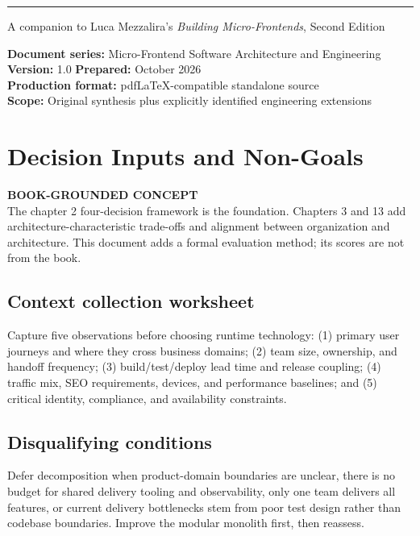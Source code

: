 \documentclass[11pt,letterpaper,oneside]{report}
\newcommand{\based}[1]{\begin{sourcebox}\textbf{BOOK-GROUNDED CONCEPT}\\#1\end{sourcebox}}
\begin{document}
\hypersetup{pageanchor=false}%
\begin{titlepage}\thispagestyle{empty}
\vspace{27pt}\noindent\color{blue}\rule{0.75\textwidth}{1.4pt}
\vspace{23pt}\par{\large\sffamily A companion to Luca Mezzalira's \emph{Building Micro-Frontends}, Second Edition}\par
\vfill\noindent\textbf{Document series:} Micro-Frontend Software Architecture and Engineering\\
\textbf{Version:} 1.0 \quad \textbf{Prepared:} October 2026\\
\textbf{Production format:} pdfLaTeX-compatible standalone source\\
\textbf{Scope:} Original synthesis plus explicitly identified engineering extensions
\end{titlepage}\hypersetup{pageanchor=true}
\tableofcontents\clearpage{}

\chapter{Decision Inputs and Non-Goals}
\based{The chapter 2 four-decision framework is the foundation. Chapters 3 and 13 add architecture-characteristic trade-offs and alignment between organization and architecture. This document adds a formal evaluation method; its scores are not from the book.}
\section{Context collection worksheet}
Capture five observations before choosing runtime technology: (1) primary user journeys and where they cross business domains; (2) team size, ownership, and handoff frequency; (3) build/test/deploy lead time and release coupling; (4) traffic mix, SEO requirements, devices, and performance baselines; and (5) critical identity, compliance, and availability constraints.
\section{Disqualifying conditions}
Defer decomposition when product-domain boundaries are unclear, there is no budget for shared delivery tooling and observability, only one team delivers all features, or current delivery bottlenecks stem from poor test design rather than codebase boundaries. Improve the modular monolith first, then reassess.
\end{document}
